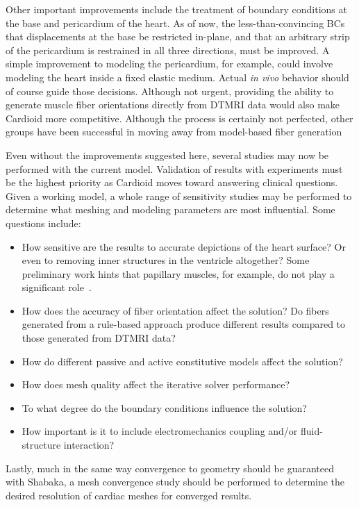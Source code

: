 Other important improvements include the treatment of boundary conditions at the base and pericardium of the heart. As of now, the less-than-convincing BCs that displacements at the base be restricted in-plane, and that an arbitrary strip of the pericardium is restrained in all three directions, must be improved. A simple improvement to modeling the pericardium, for example, could involve modeling the heart inside a fixed elastic medium. Actual \textit{in vivo} behavior should of course guide those decisions. Although not urgent, providing the ability to generate muscle fiber orientations directly from DTMRI data would also make Cardioid more competitive. Although the process is certainly not perfected, other groups have been successful in moving away from model-based fiber generation~\cite{yang_2012, zhukov_2003}

Even without the improvements suggested here, several studies may now be performed with the current model. Validation of results with experiments must be the highest priority as Cardioid moves toward answering clinical questions. Given a working model, a whole range of sensitivity studies may be performed to determine what meshing and modeling parameters are most influential. Some questions include:
\begin{itemize}[noitemsep]
\item How sensitive are the results to accurate depictions of the heart surface? Or even to removing inner structures in the ventricle altogether? Some preliminary work hints that papillary muscles, for example, do not play a significant role~\cite{korte_2019}.
\item How does the accuracy of fiber orientation affect the solution? Do fibers generated from a rule-based approach produce different results compared to those generated from DTMRI data?
\item How do different passive and active constitutive models affect the solution?
\item How does mesh quality affect the iterative solver performance?
\item To what degree do the boundary conditions influence the solution?
\item How important is it to include electromechanics coupling and/or fluid-structure interaction?
\end{itemize} 
Lastly, much in the same way convergence to geometry should be guaranteed with Shabaka, a mesh convergence study should be performed to determine the desired resolution of cardiac meshes for converged results.

